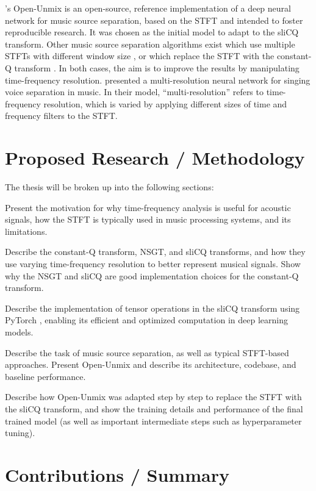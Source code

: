 \documentclass[letter,12pt]{article}
\newenvironment{tight_enumerate}{
\begin{enumerate}
  \setlength{\itemsep}{0pt}
  \setlength{\parskip}{0pt}
}{\end{enumerate}}
\begin{document}
\citet{umx}'s Open-Unmix is an open-source, reference implementation of a deep neural network for music source separation, based on the STFT and intended to foster reproducible research. It was chosen as the initial model to adapt to the sliCQ transform. Other music source separation algorithms exist which use multiple STFTs with different window size \cite{fitzgerald1, driedger}, or which replace the STFT with the constant-Q transform \cite{fitzgerald2}. In both cases, the aim is to improve the results by manipulating time-frequency resolution. \citet{plumbley2} presented a multi-resolution neural network for singing voice separation in music. In their model, ``multi-resolution'' refers to time-frequency resolution, which is varied by applying different sizes of time and frequency filters to the STFT.

\section{Proposed Research / Methodology}

The thesis will be broken up into the following sections:
\begin{tight_enumerate}
	\item
		Present the motivation for why time-frequency analysis is useful for acoustic signals, how the STFT is typically used in music processing systems, and its limitations.
	\item
		Describe the constant-Q transform, NSGT, and sliCQ transforms, and how they use varying time-frequency resolution to better represent musical signals. Show why the NSGT and sliCQ are good implementation choices for the constant-Q transform.
	\item
		Describe the implementation of tensor operations in the sliCQ transform using PyTorch \cite{pytorch}, enabling its efficient and optimized computation in deep learning models.
	\item
		Describe the task of music source separation, as well as typical STFT-based approaches. Present Open-Unmix and describe its architecture, codebase, and baseline performance.
	\item
		Describe how Open-Unmix was adapted step by step to replace the STFT with the sliCQ transform, and show the training details and performance of the final trained model (as well as important intermediate steps such as hyperparameter tuning).
\end{tight_enumerate}

\section{Contributions / Summary}
\end{document}
